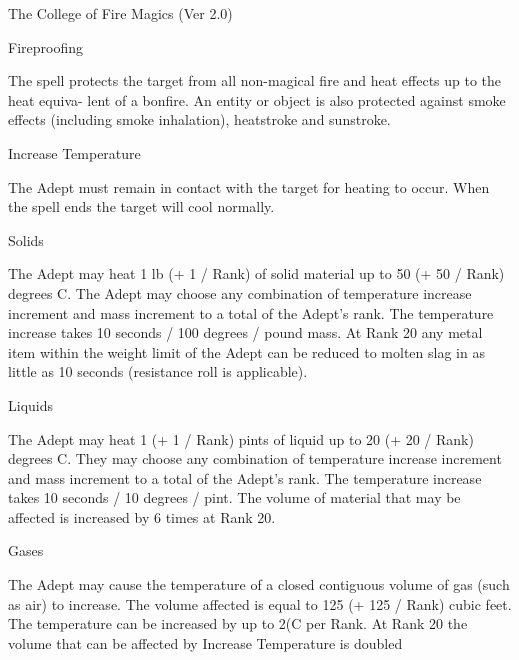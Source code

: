 \begin{Chapter}{The College of Fire Magics (Ver 2.0)}
\begin{spell}[G-5]{Fireproofing}
\begin{effects}
The spell protects the target from all non-magical fire and heat
effects up to the heat equiva- lent of a bonfire.  An entity or object
is also protected against smoke effects (including smoke inhalation),
heatstroke and sunstroke.
\end{effects}
\end{spell}

\begin{spell}[G-6]{Increase Temperature}

\begin{effects}
The Adept must remain in contact with the target for heating to
occur. When the spell ends the target will cool normally.

Solids 



The Adept may heat 1 lb (+ 1 / Rank) of solid material up to 50 (+ 50
/ Rank) degrees C.  The Adept may choose any combination of
temperature increase increment and mass increment to a total of the
Adept’s rank.  The temperature increase takes 10 seconds / 100 degrees
/ pound mass. At Rank 20 any metal item within the weight limit of the
Adept can be reduced to molten slag in as little as 10 seconds
(resistance roll is applicable).

Liquids 


The Adept may heat 1 (+ 1 / Rank) pints of liquid up to 20 (+ 20 /
Rank) degrees C.  They may choose any combination of temperature
increase increment and mass increment to a total of the Adept’s rank.
The temperature increase takes 10 seconds / 10 degrees / pint. The
volume of material that may be affected is increased by 6 times at
Rank 20.

Gases 


The Adept may cause the temperature of a closed contiguous volume of
gas (such as air) to increase.  The volume affected is equal to 125 (+
125 / Rank) cubic feet. The temperature can be increased by up to 2(C
per Rank.  At Rank 20 the volume that can be affected by Increase
Temperature is doubled


\end{effects}
\end{spell}
\end{Chapter}
